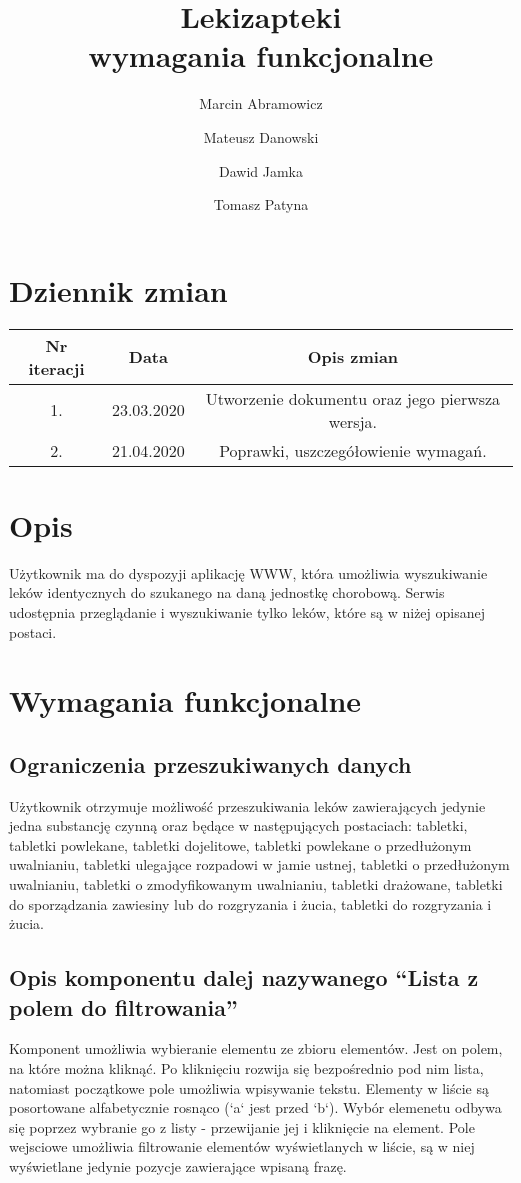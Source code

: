 \documentclass{article}
\title{
Lekizapteki\\
\large wymagania funkcjonalne}
\author{Marcin Abramowicz \and Mateusz Danowski \and Dawid Jamka \and Tomasz Patyna}
\begin{document}
  \maketitle

  \section{Dziennik zmian}
  \begin{tabular}{|c|c|c|}
    Nr iteracji & Data & Opis zmian \\
    \hline
    1. & 23.03.2020 & Utworzenie dokumentu oraz jego pierwsza wersja. \\
    \hline
    2. & 21.04.2020 & Poprawki, uszczegółowienie wymagań.
  \end{tabular}

  \section{Opis}
  Użytkownik ma do dyspozyji aplikację WWW, która umożliwia wyszukiwanie leków identycznych do szukanego na daną jednostkę chorobową.
  Serwis udostępnia przeglądanie i wyszukiwanie tylko leków, które są w niżej opisanej postaci.

  \section{Wymagania funkcjonalne}
    \subsection{Ograniczenia przeszukiwanych danych}
    Użytkownik otrzymuje możliwość przeszukiwania leków zawierających jedynie jedna substancję czynną oraz będące w następujących postaciach:
    tabletki,
    tabletki powlekane,
    tabletki dojelitowe,
    tabletki powlekane o przedłużonym uwalnianiu,
    tabletki ulegające rozpadowi w jamie ustnej,
    tabletki o przedłużonym uwalnianiu,
    tabletki o zmodyfikowanym uwalnianiu,
    tabletki drażowane,
    tabletki do sporządzania zawiesiny lub do rozgryzania i żucia,
    tabletki do rozgryzania i żucia.

    \subsection{Opis komponentu dalej nazywanego ``Lista z polem do filtrowania''}
    Komponent umożliwia wybieranie elementu ze zbioru elementów.
    Jest on polem, na które można kliknąć.
    Po kliknięciu rozwija się bezpośrednio pod nim lista, natomiast początkowe pole umożliwia wpisywanie tekstu.
    Elementy w liście są posortowane alfabetycznie rosnąco (`a` jest przed `b`).
    Wybór elemenetu odbywa się poprzez wybranie go z listy - przewijanie jej i kliknięcie na element.
    Pole wejsciowe umożliwia filtrowanie elementów wyświetlanych w liście, są w niej wyświetlane jedynie pozycje zawierające wpisaną frazę.
\end{document}
